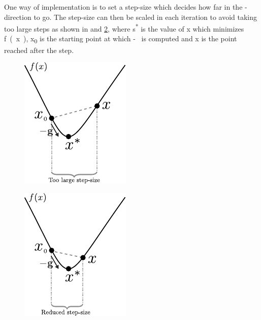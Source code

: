 One way of implementation is to set a step-size which decides how far in the \si{-} direction to go. The step-size can then be scaled in each iteration to avoid taking too large steps as shown in  and \ref{SteepestDescendSmallStep}, where \si{s^*} is the value of \si{x} which minimizes \si{f(x)}, \si{x_0} is the starting point at which \si{-} is computed and \si{x} is the point reached after the step.
%
\begin{minipage}{\linewidth}
	\begin{minipage}{0.45\linewidth}
		\begin{figure}[H]
			\includegraphics[scale=1.4]{figures/gradientDescendLargeStep}
			\centering
			\captionsetup{justification=centering}
			\label{SteepestDescendLargeStep}
		\end{figure}
	\end{minipage}
	\hspace{0.03\linewidth}
	\begin{minipage}{0.45\linewidth}
		\begin{figure}[H]
			\includegraphics[scale=1.4]{figures/gradientDescendReducedStep}
			\centering
			\captionsetup{justification=centering}
			\label{SteepestDescendSmallStep}
		\end{figure}
	\end{minipage}
\end{minipage}

